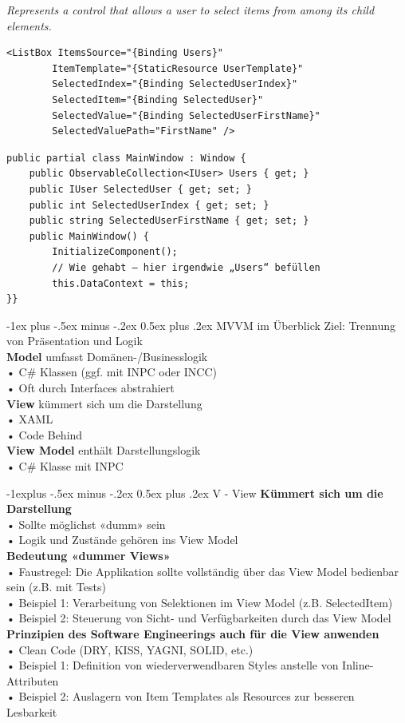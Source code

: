 \documentclass[10pt,landscape,a4paper]{article}
\makeatletter
\renewcommand{\section}{\@startsection{section}{1}{0mm}%
                                {-1ex plus -.5ex minus -.2ex}%
                                {0.5ex plus .2ex}%
                                {\normalfont\large\bfseries}}
\renewcommand{\subsection}{\@startsection{subsection}{2}{0mm}%
                                {-1explus -.5ex minus -.2ex}%
                                {0.5ex plus .2ex}%
                                {\normalfont\small\bfseries}}
\makeatother
\begin{document}
\begin{multicols*}{3}
\textit{Represents a control that allows a user to select items from among its child elements.}
\begin{verbatim}
<ListBox ItemsSource="{Binding Users}"
        ItemTemplate="{StaticResource UserTemplate}"
        SelectedIndex="{Binding SelectedUserIndex}"
        SelectedItem="{Binding SelectedUser}"
        SelectedValue="{Binding SelectedUserFirstName}"
        SelectedValuePath="FirstName" />
\end{verbatim}
\begin{verbatim}
public partial class MainWindow : Window {
    public ObservableCollection<IUser> Users { get; }
    public IUser SelectedUser { get; set; }
    public int SelectedUserIndex { get; set; }
    public string SelectedUserFirstName { get; set; }
    public MainWindow() {
        InitializeComponent();
        // Wie gehabt – hier irgendwie „Users“ befüllen
        this.DataContext = this;
}}
\end{verbatim}
\section{MVVM im Überblick}
Ziel: Trennung von Präsentation und Logik\\
\textbf{Model} umfasst Domänen-/Businesslogik\\
• C\# Klassen (ggf. mit INPC oder INCC)\\
• Oft durch Interfaces abstrahiert\\
\textbf{View} kümmert sich um die Darstellung\\
• XAML\\
• Code Behind\\
\textbf{View Model} enthält Darstellungslogik\\
• C\# Klasse mit INPC

\subsection{V - View}
\textbf{Kümmert sich um die Darstellung}\\
• Sollte möglichst «dumm» sein\\
• Logik und Zustände gehören ins View Model\\
\textbf{Bedeutung «dummer Views»}\\
• Faustregel: Die Applikation sollte vollständig über das View Model bedienbar sein (z.B. mit Tests)\\
• Beispiel 1: Verarbeitung von Selektionen im View Model (z.B. SelectedItem)\\
• Beispiel 2: Steuerung von Sicht- und Verfügbarkeiten durch das View Model\\
\textbf{Prinzipien des Software Engineerings auch für die View anwenden}\\
• Clean Code (DRY, KISS, YAGNI, SOLID, etc.)\\
• Beispiel 1: Definition von wiederverwendbaren Styles anstelle von Inline-Attributen\\
• Beispiel 2: Auslagern von Item Templates als Resources zur besseren Lesbarkeit\\


\end{multicols*}
\end{document}
